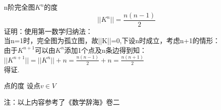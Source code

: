 \begin{theorem}{n阶完全图$K^{n}$的度}
\begin{equation}
||K^{n}||=\frac{n(n-1)}{2}
\end{equation}
证明：使用第一数学归纳法：
\\当n=1时，完全图为孤立图，故||K||=0,下设n时成立，考虑n+1的情形：
\\由于$K^{n+1}$可以由$K^{n}$添加1个点及n条边得到知：
\\ $||K^{n+1}||=||K^{n}||+n=\frac{n(n-1)}{2}+n=\frac{n(n+1)}{2}$
\\得证.
\end{theorem}
\begin{definition}{点的度}
设点$v \in V $
\end{definition}
注：以上内容参考了《数学辞海》卷二